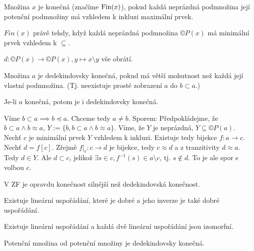 \documentclass[12pt]{article}                   %
\begin{document}

    \begin{definice}
        Množina $x$ je konečná (značíme $\operatorname{Fin}(x)$), pokud každá neprázdná podmnožina její potenční podmnožiny má vzhledem k inkluzi maximální prvek.
    \end{definice}

    \begin{pozorovani}
        $Fin(x)$ právě tehdy, když každá neprázdná podmnožina $©P(x)$ má minimální prvek vzhledem k $\subseteq$.

        \begin{dukazin}
            $d: ©P(x) \rightarrow ©P(x), y \mapsto x\setminus y$ vše obrátí.
        \end{dukazin}
    \end{pozorovani}

    \begin{definice}
        Množina $a$ je dedekindovsky konečná, pokud má větší mohutnost než každá její vlastní podmnožina. (Tj. neexistuje prosté zobrazení $a$ do $b \subset a$.)
    \end{definice}

    \begin{lemma}
        Je-li $a$ konečná, potom je i dedekindovsky konečná.

        \begin{dukazin}
            Víme $b \subset a \implies b \preceq a$. Chceme tedy $a ≠ b$. Sporem: Předpokládejme, že $b \subset a \land b \approx a$, $Y := \{b, b\subset a \land b \approx a\}$. Víme, že $Y$ je neprázdná, $Y \subseteq ©P(a)$. Nechť $c$ je minimální prvek $Y$ vzhledem k inkluzi. Existuje tedy bijekce $f: a \rightarrow c$. Nechť $d = f[c]$. Zřejmě $f|_c: c \rightarrow d$ je bijekce, tedy $c \approx d$ a z tranzitivity $d \approx a$. Tedy $d \in Y$. Ale $d \subset c$, jelikož $\exists s \in c, f^{-1}(s) \in a \setminus c$, tj. $s \notin d$. To je ale spor s volbou $c$.
        \end{dukazin}
    \end{lemma}

    \begin{poznamka}
        V ZF je opravdu konečnost silnější než dedekindovská konečnost.
    \end{poznamka}

    \begin{poznamka}
        Existuje lineární uspořádání, které je dobré a jeho inverze je také dobré uspořádání.

        Existuje lineární uspořádání a každá dvě lineární uspořádání jsou izomorfní.

        Potenční množina od potenční množiny je dedekindovsky konečná.
    \end{poznamka}
\end{document}
